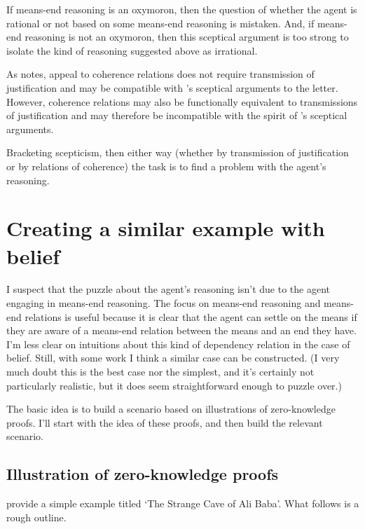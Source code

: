 \documentclass[10pt]{article}
\begin{document}
If means-end reasoning is an oxymoron, then the question of whether the agent is rational or not based on some means-end reasoning is mistaken.
And, if means-end reasoning is not an oxymoron, then this sceptical argument is too strong to isolate the kind of reasoning suggested above as irrational.

As \citeauthor{Smith:2004aa} notes, appeal to coherence relations does not require transmission of justification and may be compatible with \citeauthor{Hume:2011aa}'s sceptical arguments to the letter.
However, coherence relations may also be functionally equivalent to transmissions of justification and may therefore be incompatible with the spirit of \citeauthor{Hume:2011aa}'s sceptical arguments.

Bracketing scepticism, then either way (whether by transmission of justification or by relations of coherence) the task is to find a problem with the agent's reasoning.

\section{Creating a similar example with belief}
\label{sec:creat-simil-example}

I suspect that the puzzle about the agent's reasoning isn't due to the agent engaging in means-end reasoning.
The focus on means-end reasoning and means-end relations is useful because it is clear that the agent can settle on the means if they are aware of a means-end relation between the means and an end they have.
I'm less clear on intuitions about this kind of dependency relation in the case of belief.
Still, with some work I think a similar case can be constructed.
(I very much doubt this is the best case nor the simplest, and it's certainly not particularly realistic, but it does seem straightforward enough to puzzle over.)

The basic idea is to build a scenario based on illustrations of zero-knowledge proofs.
I'll start with the idea of these proofs, and then build the relevant scenario.

\subsection{Illustration of zero-knowledge proofs}
\label{sec:illustr-zero-knowl}

\citeauthor{Quisquater:1989aa} provide a simple example titled `The Strange Cave of Ali Baba'.
What follows is a rough outline.
\end{document}
